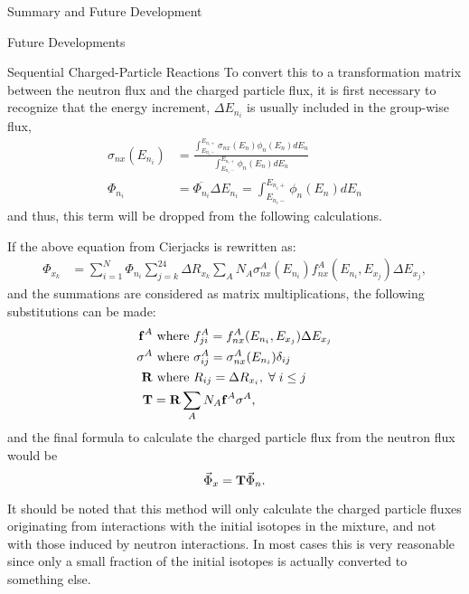 \begin{chapter}{Summary and Future Development}
\begin{section}{Future Developments}
\begin{subsection}{Sequential Charged-Particle Reactions}
      To convert this to a transformation matrix between the neutron
      flux and the charged particle flux, it is first necessary to
      recognize that the energy increment, $\Delta E_{n_i}$ is usually
      included in the group-wise flux,
      \begin{equation}
        \begin{split}
          \sigma_{nx}(E_{n_i}) &= \frac{\int_{E_{n_i-}}^{E_{n_i+}} \sigma_{nx}(E_n)
            \phi_n(E_n) dE_n}{\int_{E_{n_i-}}^{E_{n_i+}} \phi_n(E_n) dE_n}\\
          \Phi_{n_i} &= \overline{\Phi_{n_i}}\Delta E_{n_i} = \int_{E_{n_i-}}^{E_{n_i+}} \phi_n(E_n) dE_n
        \end{split}
      \end{equation}
      and thus, this term will be dropped from the following calculations.
      
      If the above equation from Cierjacks\cite{sequential} is
      rewritten as:
      \begin{equation}
        \begin{split}
          \Phi_{x_k} &= \sum_{i=1}^N \Phi_{n_i} \sum_{j=k}^{24} \Delta R_{x_k}
          \sum_A N_A \sigma_{nx}^A(E_{n_i}) f_{nx}^A(E_{n_i},E_{x_j}) \Delta E_{x_j},
        \end{split}
      \end{equation}
      and the summations are considered as matrix multiplications, the
      following substitutions can be made:
      \begin{equation}
        \begin{split}
          \mbox{$\mathbf{f}$}^A &\text{ where } f_{ji}^A = f_{nx}^A(E_{n_i},E_{x_j})\Delta E_{x_j}\\
          \mbox{$\mathbf{\sigma}$}^A &\text{ where } \sigma_{ij}^A = \sigma_{nx}^A(E_{n_i}) \delta_{ij}\\
          \mbox{$\mathbf{R}$} &\text{ where } R_{ij} = \Delta R_{x_i},\; \forall\; i \leq j\\
          \mbox{$\mathbf{T}$} &= \mbox{$\mathbf{R}$} \sum_A N_A \mbox{$\mathbf{f}$}^A \mbox{$\mathbf{\sigma}$}^A,
        \end{split}
      \end{equation}
      and the final formula to calculate the charged particle flux from
      the neutron flux would be
      \begin{equation}
        \vec{\Phi}_x = \mbox{$\mathbf{T}$}\vec{\Phi}_n.
      \end{equation}
      
      It should be noted that this method will only calculate the
      charged particle fluxes originating from interactions with the
      initial isotopes in the mixture, and not with those induced by
      neutron interactions.  In most cases this is very reasonable
      since only a small fraction of the initial isotopes is actually
      converted to something else.
    

\end{subsection}
\end{section}
\end{chapter}
